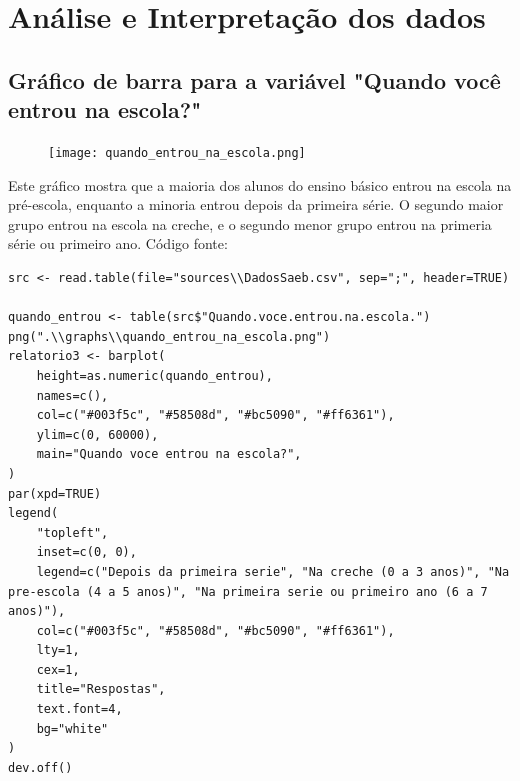 \documentclass[17pt]{extarticle}
\begin{document}
\section{Análise e Interpretação dos dados}
\subsection{Gráfico de barra para a variável "Quando você entrou na escola?"}
\begin{figure}[H]
    \texttt{[image: quando\_entrou\_na\_escola.png]}
    \centering
\end{figure}
Este gráfico mostra que a maioria dos alunos do ensino básico entrou na escola na pré-escola, enquanto a minoria entrou depois da primeira série. O segundo maior grupo entrou na escola na creche, e o segundo menor grupo entrou na primeria série ou primeiro ano. \newline
Código fonte: \newline
\begin{lstlisting}
src <- read.table(file="sources\\DadosSaeb.csv", sep=";", header=TRUE)

quando_entrou <- table(src$"Quando.voce.entrou.na.escola.")
png(".\\graphs\\quando_entrou_na_escola.png")
relatorio3 <- barplot(
    height=as.numeric(quando_entrou),
    names=c(),
    col=c("#003f5c", "#58508d", "#bc5090", "#ff6361"),
    ylim=c(0, 60000),
    main="Quando voce entrou na escola?",
)
par(xpd=TRUE)
legend(
    "topleft",
    inset=c(0, 0),
    legend=c("Depois da primeira serie", "Na creche (0 a 3 anos)", "Na pre-escola (4 a 5 anos)", "Na primeira serie ou primeiro ano (6 a 7 anos)"),
    col=c("#003f5c", "#58508d", "#bc5090", "#ff6361"),
    lty=1,
    cex=1,
    title="Respostas",
    text.font=4,
    bg="white"
)
dev.off()
\end{lstlisting}

\newpage
\end{document}
